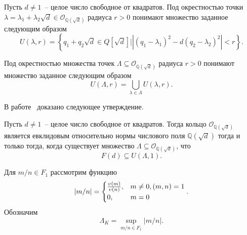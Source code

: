 \documentclass[_00_dissertation.tex]{subfiles}
\begin{document}
\begin{definition}
    Пусть $d \neq 1$~-- целое число свободное от квадратов.
    Под окрестностью точки $\lambda = \lambda_1 + \lambda_2 \sqrt{d} \in \mathcal{O}_{\mathbb{Q}(\sqrt{d})}$ радиуса $r > 0$ понимают множество заданное следующим образом
    \begin{equation*}
        U(\lambda, r) = \left\{
            q_1 + q_2 \sqrt{d} \in Q[\sqrt{d}] \big| |(q_1 - \lambda_1)^2 - d(q_2 - \lambda_2)^2| < r
        \right\}.
    \end{equation*}

    Под окрестностью множества точек $\Lambda \subseteq \mathcal{O}_{\mathbb{Q}(\sqrt{d})}$ радиуса $r > 0$ понимают множество заданное следующим образом
    \begin{equation*}
        U(\Lambda, r) = \bigcup_{\lambda \in \Lambda} U(\lambda, r).
    \end{equation*}
\end{definition}

В работе~\cite{source:Selfridge} доказано следующее утверждение.

\begin{statement}\label{proposition:fundamental_in_circle}
    Пусть $d \neq 1$~-- целое число свободное от квадратов.
    Тогда кольцо $\mathcal{O}_{\mathbb{Q}(\sqrt{d})}$ является евклидовым относительно нормы числового поля $\mathbb{Q}(\sqrt{d})$ тогда и только тогда, когда существует множество $\Lambda \subseteq \mathcal{O}_{\mathbb{Q}(\sqrt{d})}$, что
    \begin{equation*}
        F(d) \subseteq U(\Lambda, 1).
    \end{equation*}
\end{statement}

\begin{definition}\label{definition:euclidean_lambda}
    Для $m/n \in F_1$ рассмотрим функцию
    \begin{equation*}
        |m/n| = \begin{cases}
            \frac{\upsilon(m)}{\upsilon(n)}, & m \neq 0, (m, n) = 1\\
            0, & m = 0
        \end{cases}.
    \end{equation*}
    Обозначим
    \begin{equation*}
        \Lambda_K = \sup_{m/n \in F_1} |m/n|.
    \end{equation*}
\end{definition}
\end{document}
